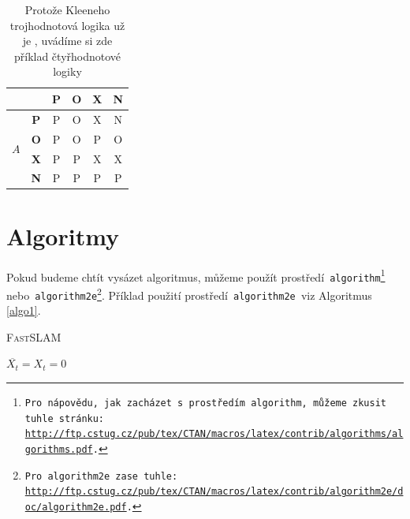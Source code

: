 \documentclass[a4paper, 11pt]{article}
\begin{document}
\begin{table}[h]
\begin{tabular}{|c|c|c|c|c|c|}
      \cline{3-6}
      \multicolumn{2}{|c|}{} & \textbf{P} & \textbf{O} & \textbf{X} & \textbf{N} \\
      \hline
      \multirow{4}{*}{$A$} & \textbf{P} & P & O & X & N \\ \cline{2-6}
                           & \textbf{O} & P & O & P & O \\ \cline{2-6}
                           & \textbf{X} & P & P & X & X \\ \cline{2-6}
                           & \textbf{N} & P & P & P & P \\ \cline{2-6}
      \hline
    \end{tabular}
    \caption{Protože Kleeneho trojhodnotová logika už je , uvádíme
    si zde příklad čtyřhodnotové logiky}
    \label{tab2}
  \end{table}
  \bigskip

  \pagebreak

  \section{Algoritmy}
  \label{algo}
  Pokud budeme chtít vysázet algoritmus, můžeme použít
  prostředí\texttt{ algorithm\footnote{
    Pro nápovědu, jak zacházet s prostředím\texttt{ algorithm,} můžeme
    zkusit tuhle stránku:\\
    \href{http://ftp.cstug.cz/pub/tex/CTAN/macros/latex/contrib/algorithms/algorithms.pdf}
    {http://ftp.cstug.cz/pub/tex/CTAN/macros/latex/contrib/algorithms/algorithms.pdf}.
  } } nebo\texttt{ algorithm2e\footnote{
    Pro\texttt{ algorithm2e }zase tuhle: 
    \href{http://ftp.cstug.cz/pub/tex/CTAN/macros/latex/contrib/algorithm2e/doc/algorithm2e.pdf}
    {http://ftp.cstug.cz/pub/tex/CTAN/macros/latex/contrib/algorithm2e/doc/algorithm2e.pdf}.
  }}. Příklad použití prostředí\texttt{ algorithm2e }viz Algoritmus \ref{algo1}.
  \vspace{0.95em}
  \begin{algorithm}[h]
    \label{algo1}
    \caption{\textsc{Fast}SLAM}
    \Indp\Indpp\Indpp
    \SetNlSty{}{}{:}
    \SetNlSkip{-1.2em}
    \medskip
    $\overline{X_t} = X_t = 0$ \\
  \end{algorithm}
\end{document}
